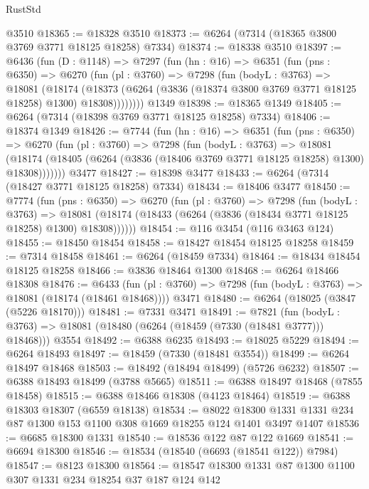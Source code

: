 \begin{lexlean}{RustStd}
\begin{coremodule}
    @3510
@18365 := @18328 @3510
@18373 := @6264 (@7314 (@18365 @3800 @3769 @3771 @18125 @18258) @7334)
@18374 := @18338 @3510
@18397 := @6436
    (fun (D : @1148) =>
    @7297
      (fun (hn : @16) =>
      @6351
        (fun (pns : @6350) =>
        @6270
          (fun (pl : @3760) =>
          @7298
            (fun (bodyL : @3763) =>
            @18081
              (@18174
                (@18373 (@6264 (@3836 (@18374 @3800 @3769 @3771 @18125 @18258) @1300) @18308))))))))
    @1349
@18398 := @18365 @1349
@18405 := @6264 (@7314 (@18398 @3769 @3771 @18125 @18258) @7334)
@18406 := @18374 @1349
@18426 := @7744
    (fun (hn : @16) =>
    @6351
      (fun (pns : @6350) =>
      @6270
        (fun (pl : @3760) =>
        @7298
          (fun (bodyL : @3763) =>
          @18081
            (@18174 (@18405 (@6264 (@3836 (@18406 @3769 @3771 @18125 @18258) @1300) @18308)))))))
    @3477
@18427 := @18398 @3477
@18433 := @6264 (@7314 (@18427 @3771 @18125 @18258) @7334)
@18434 := @18406 @3477
@18450 := @7774
    (fun (pns : @6350) =>
    @6270
      (fun (pl : @3760) =>
      @7298
        (fun (bodyL : @3763) =>
        @18081 (@18174 (@18433 (@6264 (@3836 (@18434 @3771 @18125 @18258) @1300) @18308))))))
@18454 := @116 @3454 (@116 @3463 @124)
@18455 := @18450 @18454
@18458 := @18427 @18454 @18125 @18258
@18459 := @7314 @18458
@18461 := @6264 (@18459 @7334)
@18464 := @18434 @18454 @18125 @18258
@18466 := @3836 @18464 @1300
@18468 := @6264 @18466 @18308
@18476 := @6433
    (fun (pl : @3760) => @7298 (fun (bodyL : @3763) => @18081 (@18174 (@18461 @18468))))
    @3471
@18480 := @6264 (@18025 (@3847 (@5226 @18170)))
@18481 := @7331 @3471
@18491 := @7821
    (fun (bodyL : @3763) => @18081 (@18480 (@6264 (@18459 (@7330 (@18481 @3777))) @18468)))
    @3554
@18492 := @6388 @6235
@18493 := @18025 @5229
@18494 := @6264 @18493
@18497 := @18459 (@7330 (@18481 @3554))
@18499 := @6264 @18497 @18468
@18503 := @18492 (@18494 @18499) (@5726 @6232)
@18507 := @6388 @18493 @18499 (@3788 @5665)
@18511 := @6388 @18497 @18468 (@7855 @18458)
@18515 := @6388 @18466 @18308 (@4123 @18464)
@18519 := @6388 @18303 @18307 (@6559 @18138)
@18534 := @8022
    @18300
    @1331
    @1331
    @234
    @87
    @1300
    @153
    @1100
    @308
    @1669
    @18255
    @124
    @1401
    @3497
    @1407
@18536 := @6685 @18300 @1331
@18540 := @18536 @122 @87 @122 @1669
@18541 := @6694 @18300
@18546 := @18534 (@18540 (@6693 (@18541 @122)) @7984)
@18547 := @8123 @18300
@18564 := @18547
    @18300
    @1331
    @87
    @1300
    @1100
    @307
    @1331
    @234
    @18254
    @37
    @187
    @124
    @142

\end{coremodule}
\end{lexlean}
